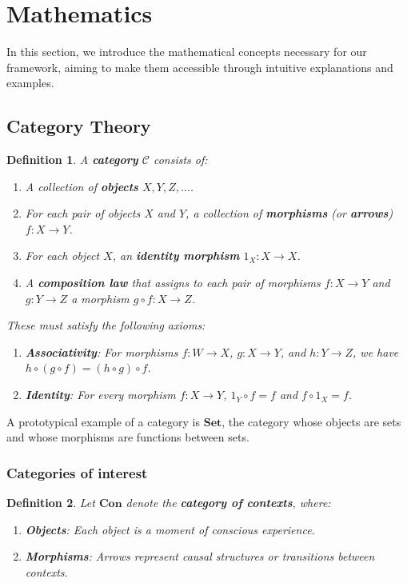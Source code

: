 \documentclass{article}
\newtheorem{definition}{Definition}[section]
\begin{document}
\section{Mathematics}
In this section, we introduce the mathematical concepts necessary for our framework, aiming to make them accessible through intuitive explanations and examples.

\subsection{Category Theory}

\begin{definition}
    A \textbf{category} $\mathcal{C}$ consists of:
    \begin{enumerate}[label=(\alph*)]
        \item A collection of \textbf{objects} $X, Y, Z, \dots$.
        \item For each pair of objects $X$ and $Y$, a collection of \textbf{morphisms} (or \textbf{arrows}) $f \colon X \to Y$.
        \item For each object $X$, an \textbf{identity morphism} $1_X \colon X \to X$.
        \item A \textbf{composition law} that assigns to each pair of morphisms $f \colon X \to Y$ and $g \colon Y \to Z$ a morphism $g \circ f \colon X \to Z$.
    \end{enumerate}
    These must satisfy the following axioms:
    \begin{enumerate}
        \item \textbf{Associativity}: For morphisms $f \colon W \to X$, $g \colon X \to Y$, and $h \colon Y \to Z$, we have $h \circ (g \circ f) = (h \circ g) \circ f$.
        \item \textbf{Identity}: For every morphism $f \colon X \to Y$, $1_Y \circ f = f$ and $f \circ 1_X = f$.
    \end{enumerate}
\end{definition}

A prototypical example of a category is $\mathbf{Set}$, the category whose objects are sets and whose morphisms are functions between sets.

\subsubsection{Categories of interest}
\begin{definition}
    Let $\mathbf{Con}$ denote the \textbf{category of contexts}, where:
    \begin{enumerate}
        \item \textbf{Objects}: Each object is a moment of conscious experience.
        \item \textbf{Morphisms}: Arrows represent causal structures or transitions between contexts.
    \end{enumerate}
\end{definition}
\end{document}
